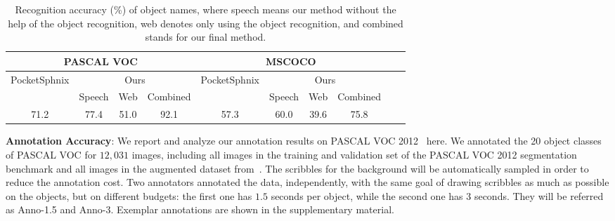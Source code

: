 \documentclass[runningheads]{llncs}
\begin{document}
\begin{table}[tb]
\centering
\setlength\tabcolsep{1mm}
\begin{tabular}{|c|c|c|c|c|c|c|c|c|c|  }
 \hline
 \multicolumn{4}{|c|}{PASCAL VOC} &  \multicolumn{4}{|c|}{MSCOCO} \\
 \hline
 \multirow{2}{*}{PocketSphnix} &  \multicolumn{3}{|c|}{Ours} &  \multirow{2}{*}{PocketSphnix} &  \multicolumn{3}{|c|}{Ours} \\ 
 \cline{2-4}    \cline{6-8} 
        &   Speech  & Web &  Combined  &   &   Speech  & Web &  Combined  \\                 
 \hline
   71.2 &  77.4   & 51.0 & 92.1 & 57.3 & 60.0 & 39.6 & 75.8\\
 \hline
\end{tabular}        
 \caption{Recognition accuracy (\%) of object names, where speech means our method without the help of the object recognition, web denotes only using the object recognition, and combined stands for our final method.}
 \label{table:class:eval}  
 \vspace{-6mm}
\end{table}

\textbf{Annotation Accuracy}: 
We report and analyze our annotation results on PASCAL VOC 2012~\citep{pascal:2011} here. 
We annotated the 20 object classes of PASCAL VOC for $12,031$ images, including all images in the training and validation set of the PASCAL
VOC 2012 segmentation benchmark and all images in the augmented
dataset from~\citep{semantic:contour}. The scribbles for the background will be automatically sampled in order to reduce the annotation cost. 
Two annotators annotated the data, independently, with the same goal of drawing scribbles as much as possible on the objects, but on different
budgets: the first one has $1.5$ seconds per object, while the second
one has $3$ seconds. They will be referred as Anno-1.5 and
Anno-3. Exemplar annotations are shown in the
supplementary material.
\end{document}
